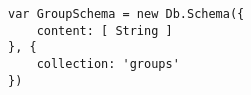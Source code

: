 

\lstset{language=C}

\begin{lstlisting}[frame=single]
var GroupSchema = new Db.Schema({
	content: [ String ]
}, {
	collection: 'groups'
})
\end{lstlisting}